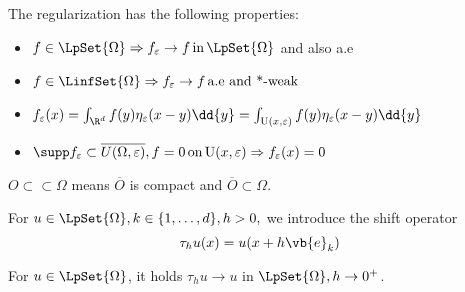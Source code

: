 \begin{remark}
	The regularization has the following properties:
	\begin{itemize}
		\item $f \in \LpSet{\Omega} \Rightarrow f_{\varepsilon} \to f \, \text{in} \, \LpSet{\Omega}$ and also a.e
		\item $f \in \LinfSet{\Omega} \Rightarrow f_{\varepsilon} \to f \, \text{a.e and *-weak} \,$
		\item $f_{\varepsilon}(x) = \int_{\R^d}f(y)\eta_{\varepsilon}(x-y)\dd{y} = \int_{\text{U}(x,\varepsilon)}f(y) \eta_{\varepsilon}(x-y)\dd{y}$
		\item $\supp f_{\varepsilon} \subset \overline{U(\Omega,\varepsilon)}, f=0 \, \text{on} \,\text{U}(x,\varepsilon) \Rightarrow f_{\varepsilon}(x)=0$
	\end{itemize}
\end{remark}

\begin{definition}
	$O \subset \subset \Omega$ means $\overline{O}$ is compact and $\overline{O}\subset \Omega$.
\end{definition}

\begin{definition}
	For $u \in \LpSet{\Omega}, k \in \{1,\dots,d\}, h >0, $ we introduce the shift operator
	\begin{equation*}
		\tau_h u(x)=u(x+h \vb{e}_k)
	\end{equation*}
\end{definition}

\begin{lemma}
	For $u \in \LpSet{\Omega}$, it holds $\tau_h u \to u$ in $\LpSet{\Omega}, h\to 0^+$.
\end{lemma}


